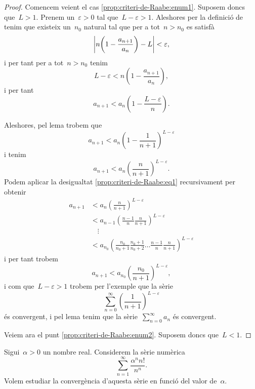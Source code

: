 \documentclass[../../main.tex]{subfiles}
\begin{document}
    \begin{proof}
        Comencem veient el cas \eqref{prop:criteri-de-Raabe:enum1}.
        Suposem doncs que~\(L>1\).
        Prenem un~\(\varepsilon>0\) tal que~\(L-\varepsilon>1\).
        Aleshores per la definició de  tenim que existeix un~\(n_{0}\) natural tal que per a tot~\(n>n_{0}\) es satisfà
        \[
            \abs{n\left(1-\frac{a_{n+1}}{a_{n}}\right)-L}<\varepsilon,
        \]
        i per tant per a tot~\(n>n_{0}\) tenim
        \[
            L-\varepsilon<n\left(1-\frac{a_{n+1}}{a_{n}}\right),
        \]
        i per tant
        \[
            a_{n+1}<a_{n}\left(1-\frac{L-\varepsilon}{n}\right).
        \]

        Aleshores, pel lema  trobem que
        \[
            a_{n+1}<a_{n}\left(1-\frac{1}{n+1}\right)^{L-\varepsilon}
        \]
        i tenim
        \begin{equation}
            \label{prop:criteri-de-Raabe:eq1}
            a_{n+1}<a_{n}\left(\frac{n}{n+1}\right)^{L-\varepsilon}.
        \end{equation}
        Podem aplicar la desigualtat \eqref{prop:criteri-de-Raabe:eq1} recursivament per obtenir
        \begin{align*}
            a_{n+1}&<a_{n}\left(\frac{n}{n+1}\right)^{L-\varepsilon}\\
            &<a_{n-1}\left(\frac{n-1}{n}\frac{n}{n+1}\right)^{L-\varepsilon}\\
            &\quad\vdots\\
            &<a_{n_{0}}\left(\frac{n_{0}}{n_{0}+1}\frac{n_{0}+1}{n_{0}+2}\dots\frac{n-1}{n}\frac{n}{n+1}\right)^{L-\varepsilon}
        \end{align*}
        i per tant trobem
        \[
            a_{n+1}<a_{n_{0}}\left(\frac{n_{0}}{n+1}\right)^{L-\varepsilon},
        \]
        i com que~\(L-\varepsilon>1\) trobem per l'exemple  que la sèrie
        \[
            \sum_{n=0}^{\infty}\left(\frac{1}{n+1}\right)^{L-\varepsilon}
        \]
        és convergent, i pel lema  tenim que la sèrie~\(\sum_{n=0}^{\infty}a_{n}\) és convergent.

        Veiem ara el punt \eqref{prop:criteri-de-Raabe:enum2}.
        Suposem doncs que~\(L<1\).
    \end{proof}
    \begin{example}
        \label{ex:quocient-Raabe}
        Sigui~\(\alpha>0\) un nombre real.
        Considerem la sèrie numèrica
        \begin{equation}
            \label{ex:quocient-Raabe:eq1}
            \sum_{n=1}^{\infty}\frac{\alpha^{n}n!}{n^{n}}.
        \end{equation}
        Volem estudiar la convergència d'aquesta sèrie en funció del valor de~\(\alpha\).
    \end{example}
\end{document}
